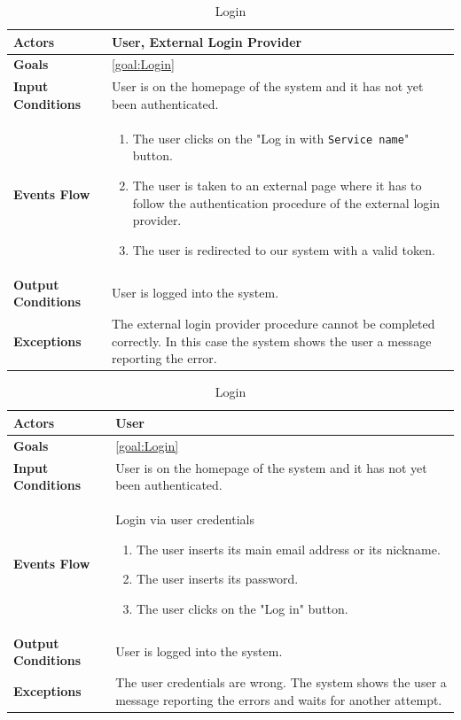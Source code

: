 \begin{table}[H]
	\centering
	\def\arraystretch{1.5}
	\begin{tabular}{|p{7cm}|p{7cm}|}
		\hline
		\textbf{Actors}            & User, External Login Provider		    \\ \hline
		\textbf{Goals}             & \ref{goal:Login}           \\ \hline
		\textbf{Input Conditions}  & User is on the homepage of the system and it has not yet been authenticated.           \\ \hline
		\textbf{Events Flow}       &    
		\begin{enumerate}
			\item The user clicks on the "Log in with \texttt{Service name}" button.
			\item The user is taken to an external page where it has to follow the authentication procedure of the external login provider.
			\item The user is redirected to our system with a valid token.
		\end{enumerate} \\ \hline
		\textbf{Output Conditions} & User is logged into the system.          \\ \hline
		\textbf{Exceptions}        & The external login provider procedure cannot be completed correctly. In this case the system shows the user a message reporting the error.         \\ \hline
	\end{tabular}
	\caption{Login\label{UseCaseDescr:LoginExternal}}
\end{table}

\begin{table}[H]
	\centering
	\def\arraystretch{1.5}
	\begin{tabular}{|p{7cm}|p{7cm}|}
		\hline
		\textbf{Actors}            & User	    \\ \hline
		\textbf{Goals}             & \ref{goal:Login}           \\ \hline
		\textbf{Input Conditions}  & User is on the homepage of the system and it has not yet been authenticated.           \\ \hline
		\textbf{Events Flow}       &    
		 	Login via user credentials
			 	\begin{enumerate}
			 		\item The user inserts its main email address or its nickname.
			 		\item The user inserts its password.
			 		\item The user clicks on the "Log in" button.
			 	\end{enumerate}\\ \hline
		\textbf{Output Conditions} & User is logged into the system.          \\ \hline
		\textbf{Exceptions}        & The user credentials are wrong. The system shows the user a message reporting the errors and waits for another attempt.         \\ \hline
	\end{tabular}
	\caption{Login\label{UseCaseDescr:LoginNormal}}
\end{table}

